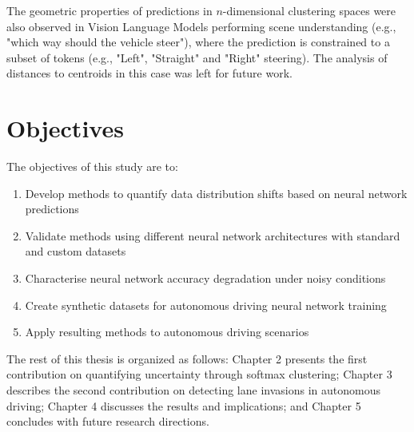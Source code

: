 The geometric properties of predictions in $n$-dimensional clustering spaces were also observed in Vision Language Models performing scene understanding (e.g., "which way should the vehicle steer"), where the prediction is constrained to a subset of tokens (e.g., "Left", "Straight" and "Right" steering). The analysis of distances to centroids in this case was left for future work.

\section{Objectives}

The objectives of this study are to:

\begin{enumerate}
    \item Develop methods to quantify data distribution shifts based on neural network predictions
    \item Validate methods using different neural network architectures with standard and custom datasets
    \item Characterise neural network accuracy degradation under noisy conditions
    \item Create synthetic datasets for autonomous driving neural network training
    \item Apply resulting methods to autonomous driving scenarios
\end{enumerate}

The rest of this thesis is organized as follows: Chapter 2 presents the first contribution on quantifying uncertainty through softmax clustering; Chapter 3 describes the second contribution on detecting lane invasions in autonomous driving; Chapter 4 discusses the results and implications; and Chapter 5 concludes with future research directions.

